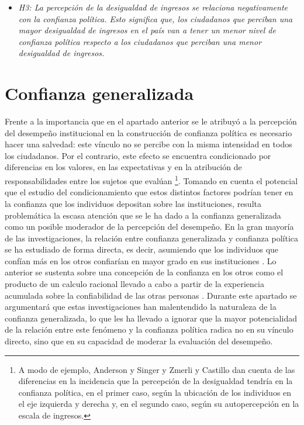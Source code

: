 \documentclass[12pt,twoside]{templates/facsothesis}
\providecommand{\tightlist}{%
  \setlength{\itemsep}{0pt}\setlength{\parskip}{0pt}}
\begin{document}
\begin{itemize}
\tightlist
\item
  \emph{H3: La percepción de la desigualdad de ingresos se relaciona negativamente con la confianza política. Esto significa que, los ciudadanos que perciban una mayor desigualdad de ingresos en el país van a tener un menor nivel de confianza política respecto a los ciudadanos que perciban una menor desigualdad de ingresos.}
\end{itemize}

\section{Confianza generalizada}\label{confianza-generalizada}

Frente a la importancia que en el apartado anterior se le atribuyó a la percepción del desempeño institucional en la construcción de confianza política es necesario hacer una salvedad: este vínculo no se percibe con la misma intensidad en todos los ciudadanos. Por el contrario, este efecto se encuentra condicionado por diferencias en los valores, en las expectativas y en la atribución de responsabilidades entre los sujetos que evalúan \citep{vandermeerEconomicPerformancePolitical2018, vandermeerPoliticalTrustEvaluation2017} \footnote{A modo de ejemplo, Anderson y Singer \citeyearpar{andersonSensitiveLeftImpervious2008} y Zmerli y Castillo \citeyearpar{zmerliIncomeInequalityDistributive2015} dan cuenta de las diferencias en la incidencia que la percepción de la desigualdad tendría en la confianza política, en el primer caso, según la ubicación de los individuos en el eje izquierda y derecha y, en el segundo caso, según su autopercepción en la escala de ingresos.}. Tomando en cuenta el potencial que el estudio del condicionamiento que estos distintos factores podrían tener en la confianza que los individuos depositan sobre las instituciones, resulta problemática la escasa atención que se le ha dado a la confianza generalizada como un posible moderador de la percepción del desempeño. En la gran mayoría de las investigaciones, la relación entre confianza generalizada y confianza política se ha estudiado de forma directa, es decir, asumiendo que los individuos que confían más en los otros confiarían en mayor grado en sus instituciones \citep{boothLegitimacyPuzzleLatin2009, mainwaringStateDeficienciesParty2006, mattesSocialPoliticalTrust2018, morrisCorruptionTrustTheoretical2010, zmerliWinnersLosersThree2013}. Lo anterior se sustenta sobre una concepción de la confianza en los otros como el producto de un calculo racional llevado a cabo a partir de la experiencia acumulada sobre la confiabilidad de las otras personas \citep{newtonSocialPoliticalTrust2017}. Durante este apartado se argumentará que estas investigaciones han malentendido la naturaleza de la confianza generalizada, lo que les ha llevado a ignorar que la mayor potencialidad de la relación entre este fenómeno y la confianza política radica no en su vínculo directo, sino que en su capacidad de moderar la evaluación del desempeño.
\end{document}
